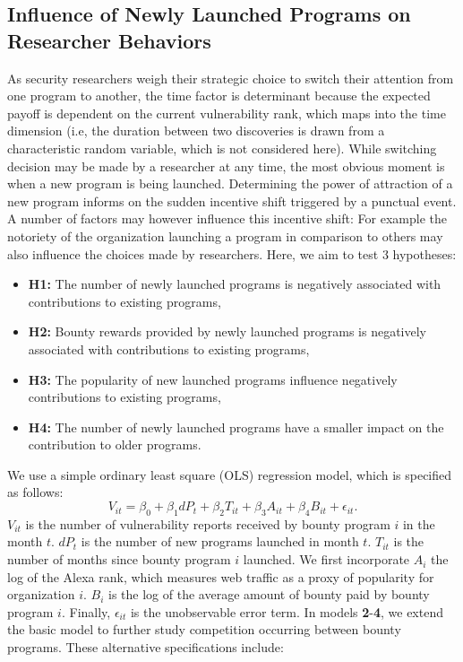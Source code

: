 \subsection{Influence of Newly Launched Programs on Researcher Behaviors}
\label{ols}
As security researchers weigh their strategic choice to switch their attention from one program to another, the time factor is determinant because the expected payoff is dependent on the current vulnerability rank, which maps into the time dimension (i.e, the duration between two discoveries is drawn from a characteristic random variable, which is not considered here). While switching decision may be made by a researcher at any time, the most obvious moment is when a new program is being launched. Determining the power of attraction of a new program informs on the sudden incentive shift triggered by a punctual event. A number of factors may however influence this incentive shift: For example the notoriety of the organization launching a program in comparison to others may also influence the choices made by researchers. Here, we aim to test  3 hypotheses:

\begin{itemize}
  \item {\bf H1:} The number of newly launched programs is negatively associated with contributions to existing programs,
  \item {\bf H2:} Bounty rewards provided by newly launched programs is negatively associated with contributions to existing programs,
  \item {\bf H3: } The popularity of new launched programs influence negatively contributions to existing programs,
  \item {\bf H4:} The number of newly launched programs have a smaller impact on the contribution to older programs.
\end{itemize}


We use a simple ordinary least square (OLS) regression model, which is specified as follows:
\begin{equation}
\label{reg_base}
V_{it} = \beta_0 + \beta_1 dP_t + \beta_2 T_{it} + \beta_3 A_{it} + \beta_4 B_{it} + \epsilon_{it}.
\end{equation}
$V_{it}$ is the number of vulnerability reports received by bounty program $i$ in the month $t$. $dP_t$ is the number of new programs launched in month $t$. $T_{it}$ is the number of months since bounty program $i$ launched. We first incorporate $A_i$ the log of the Alexa rank, which measures web traffic  as a proxy of popularity for organization $i$. $B_i$ is the log of the average amount of bounty paid by bounty program $i$. Finally, $\epsilon_{it}$ is the unobservable error term. In models {\bf 2}-{\bf 4}, we extend the basic model to further study competition occurring between bounty programs. These alternative specifications include:

